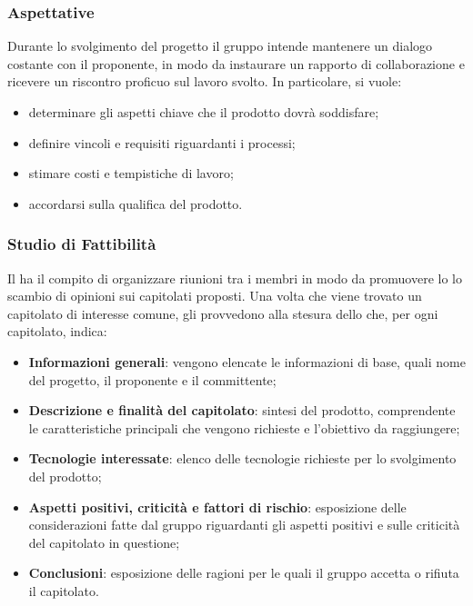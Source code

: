 \subsubsection{Aspettative}
Durante lo svolgimento del progetto il gruppo intende mantenere un dialogo costante con il proponente, in modo da instaurare un rapporto di collaborazione e ricevere un riscontro proficuo sul lavoro svolto.  In particolare, si vuole:
\begin{itemize}
	\item determinare gli aspetti chiave che il prodotto dovrà soddisfare;
	\item definire vincoli e requisiti riguardanti i processi;
	\item stimare costi e tempistiche di lavoro;
	\item accordarsi sulla qualifica del prodotto.
\end{itemize}
\subsubsection{Studio di Fattibilità}
Il \RdP{} ha il compito di organizzare riunioni tra i membri in modo da promuovere lo lo scambio di opinioni sui capitolati proposti. Una volta che viene trovato un capitolato di interesse comune, gli \anas{} provvedono alla stesura dello \SdF{} che, per ogni capitolato, indica:
\begin{itemize}
	\item \textbf{Informazioni generali}: vengono elencate le informazioni di base,  quali nome del progetto, il proponente e il committente;
	\item \textbf{Descrizione e finalità del capitolato}: sintesi del prodotto, comprendente le caratteristiche principali che vengono richieste e l'obiettivo da raggiungere;
	\item \textbf{Tecnologie interessate}: elenco delle tecnologie richieste per lo svolgimento del prodotto;
	\item \textbf{Aspetti positivi, criticità e fattori di rischio}: esposizione delle considerazioni fatte dal gruppo riguardanti gli aspetti positivi e sulle criticità del capitolato in questione;
	\item \textbf{Conclusioni}: esposizione delle ragioni per le quali il gruppo accetta o rifiuta il capitolato.
\end{itemize}
